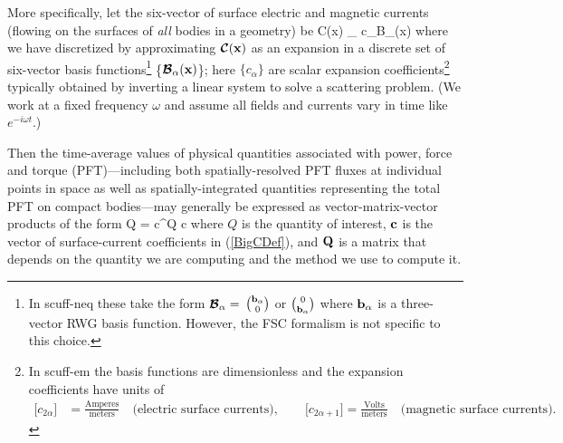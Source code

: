 \documentclass[letterpaper]{article}
\begin{document}
More specifically, let the six-vector of surface electric
and magnetic currents (flowing on the surfaces of \textit{all}
bodies in a geometry) be
{
  \bmc C(\vb x)
  \approx \sum_{\alpha} c_\alpha \bmc B_\alpha(\vb x)
}
where we have discretized by approximating $\boldsymbol{\mathcal{C}}(\mathbf{x})$ as an
expansion in a discrete set of six-vector basis
functions\footnote{In {\sc scuff-neq} these take the form
$\boldsymbol{\mathcal{B}}_\alpha=$ 
$\mathbf{b}_\alpha \choose 0$ 
or 
$0 \choose \mathbf{b}_\alpha$
where $\mathbf{b}_\alpha$ is a three-vector RWG basis function.
However, the FSC formalism is not specific to this choice.}
\{$\boldsymbol{\mathcal{B}}_\alpha(\mathbf{x})$\}; here $\{c_\alpha\}$ are 
scalar expansion coefficients\footnote{In {\sc scuff-em} 
the basis functions are dimensionless and the expansion
coefficients have units of 
\begin{align*}
 \big[c_{2\alpha}\big]&=\frac{\text{Amperes}}{\text{meters}}
 \quad \text{(electric surface currents)}, \qquad
 \big[c_{2\alpha+1}\big]=\frac{\text{Volts}}{\text{meters}}
 \quad \text{(magnetic surface currents).}
\end{align*}} typically obtained by 
inverting a linear system to solve a scattering 
problem.
(We work at a fixed frequency $\omega$ and assume all fields
and currents vary in time like $e^{-i\omega t}$.)

Then the time-average values of physical quantities associated 
with power, force and torque (PFT)---including both spatially-resolved
PFT fluxes at individual points in space as well as spatially-integrated
quantities representing the total PFT on compact bodies---may 
generally be expressed as vector-matrix-vector products of the 
form
 {Q = \vb c^\dagger \vb Q \vb c}
where $Q$ is the quantity of interest, $\mathbf{c}$ is the 
vector of surface-current coefficients in (\ref{BigCDef}),
and $\mathbf{Q}$ is a matrix
that depends on the quantity we are computing and the method we
use to compute it.
\end{document}
